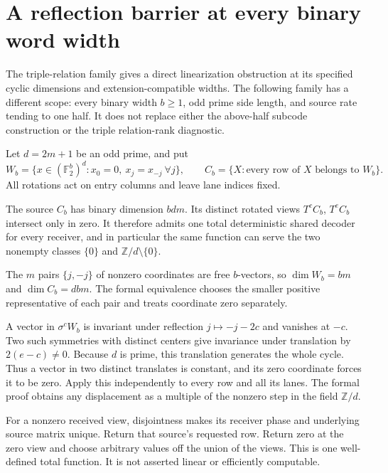 \section{A reflection barrier at every binary word width}
\label{sec:prime-reflection}

The triple-relation family gives a direct linearization obstruction at its
specified cyclic dimensions and extension-compatible widths. The following
family has a different scope: every binary width $b\ge1$, odd prime side
length, and source rate tending to one half. It does not replace either the
above-half subcode construction or the triple relation-rank diagnostic.

Let $d=2m+1$ be an odd prime, and put
\[
 W_b=\{x\in(\mathbb F_2^b)^d:x_0=0,\ x_j=x_{-j}\ \forall j\},\qquad
 C_b=\{X:\text{every row of }X\text{ belongs to }W_b\}.
\]
All rotations act on entry columns and leave lane indices fixed.

\begin{theorem}\label{thm:reflection-source}
The source $C_b$ has binary dimension $bdm$. Its distinct rotated views
$T^cC_b$, $T^eC_b$ intersect only in zero. It therefore admits one total
deterministic shared decoder for every receiver, and in particular the same
function can serve the two nonempty classes $\{0\}$ and
$\mathbb Z/d\setminus\{0\}$.
\end{theorem}

\begin{outline}
The $m$ pairs $\{j,-j\}$ of nonzero coordinates are free $b$-vectors, so
$\dim W_b=bm$ and $\dim C_b=dbm$. The formal equivalence chooses the
smaller positive representative of each pair and treats coordinate zero
separately.

A vector in $\sigma^cW_b$ is invariant under reflection
$j\mapsto-j-2c$ and vanishes at $-c$. Two such symmetries with distinct
centers give invariance under translation by $2(e-c)\ne0$. Because $d$ is
prime, this translation generates the whole cycle. Thus a vector in two
distinct translates is constant, and its zero coordinate forces it to be
zero. Apply this independently to every row and all its lanes. The formal
proof obtains any displacement as a multiple of the nonzero step in the
field $\mathbb Z/d$.

For a nonzero received view, disjointness makes its receiver phase and
underlying source matrix unique. Return that source's requested row.
Return zero at the zero view and choose arbitrary values off the union of
the views. This is one well-defined total function. It is not asserted
linear or efficiently computable.
\end{outline}


